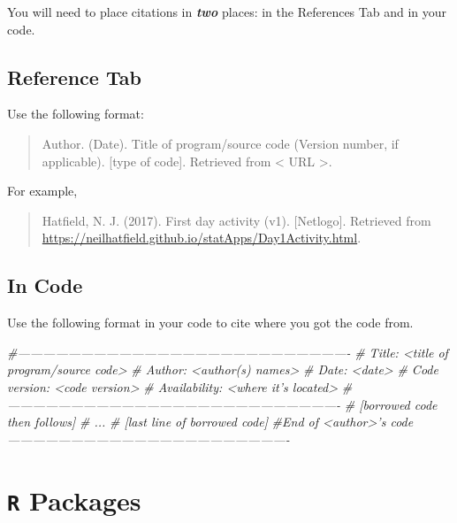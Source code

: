 \documentclass[]{book}
\newenvironment{Shaded}{\begin{snugshade}}{\end{snugshade}}
\newcommand{\CommentTok}[1]{\textcolor[rgb]{0.56,0.35,0.01}{\textit{#1}}}
\begin{document}
You will need to place citations in \emph{\textbf{two}} places: in the References Tab and in your code.

\hypertarget{reference-tab}{%
\subsection{Reference Tab}\label{reference-tab}}

Use the following format:

\begin{quote}
Author. (Date). Title of program/source code (Version number, if applicable). {[}type of code{]}. Retrieved from \textless{} URL \textgreater{}.
\end{quote}

For example,

\begin{quote}
Hatfield, N. J. (2017). First day activity (v1). {[}Netlogo{]}. Retrieved from \url{https://neilhatfield.github.io/statApps/Day1Activity.html}.
\end{quote}

\hypertarget{in-code}{%
\subsection{In Code}\label{in-code}}

Use the following format in your code to cite where you got the code from.

\begin{Shaded}
\begin{Highlighting}[]
\CommentTok{#-------------------------------------------------------------------------------}
\CommentTok{#  Title: <title of program/source code>}
\CommentTok{#  Author: <author(s) names>}
\CommentTok{#  Date: <date>}
\CommentTok{#  Code version: <code version>}
\CommentTok{#  Availability: <where it's located>}
\CommentTok{#-------------------------------------------------------------------------------}
\CommentTok{# [borrowed code then follows]}
\CommentTok{# ...}
\CommentTok{# [last line of borrowed code]      }
\CommentTok{#End of <author>'s code-------------------------------------------------------------------}
\end{Highlighting}
\end{Shaded}

\hypertarget{r-packages}{%
\section{\texorpdfstring{\texttt{R} Packages}{R Packages}}\label{r-packages}}
\end{document}
